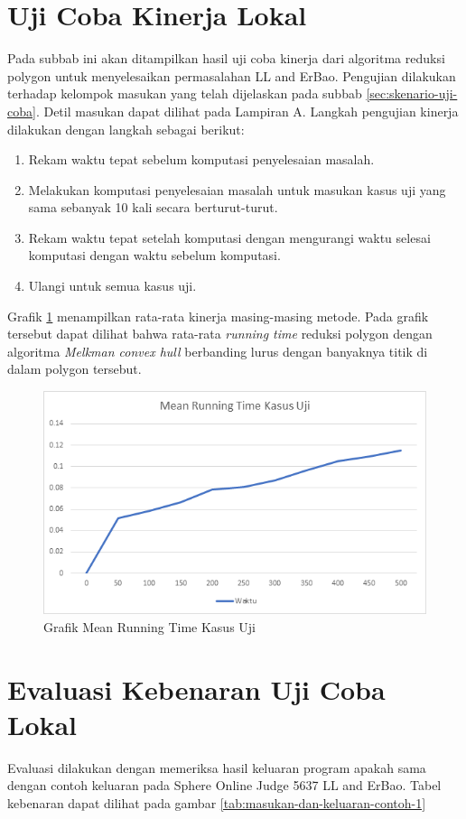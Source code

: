 \section{ Uji Coba Kinerja Lokal}
Pada subbab ini akan ditampilkan hasil uji coba kinerja dari algoritma reduksi polygon untuk menyelesaikan permasalahan LL and ErBao. Pengujian dilakukan terhadap kelompok masukan yang telah dijelaskan pada subbab \ref{sec:skenario-uji-coba}. Detil masukan dapat dilihat pada Lampiran A. Langkah pengujian kinerja dilakukan dengan langkah sebagai berikut:
\begin{enumerate}
	\item Rekam waktu tepat sebelum komputasi penyelesaian masalah.
	\item Melakukan komputasi penyelesaian masalah untuk masukan kasus uji yang sama sebanyak 10 kali secara berturut-turut.
	\item Rekam waktu tepat setelah komputasi dengan mengurangi waktu selesai komputasi dengan waktu sebelum komputasi.
	\item Ulangi untuk semua kasus uji.
\end{enumerate}
\par Grafik \ref{fig:mean-running-time} menampilkan rata-rata kinerja masing-masing metode. Pada grafik tersebut dapat dilihat bahwa rata-rata \textit{running time} reduksi polygon dengan algoritma \textit{Melkman convex hull} berbanding lurus dengan banyaknya titik di dalam polygon tersebut.
\begin{figure}[!h]
	\Centering
	\includegraphics [width=\columnwidth]{bab5/img/mean-running-time}
	\caption {Grafik Mean Running Time Kasus Uji}
	\label {fig:mean-running-time}
\end{figure}

\section{ Evaluasi Kebenaran Uji Coba Lokal}
Evaluasi dilakukan dengan memeriksa hasil keluaran program apakah sama dengan contoh keluaran pada Sphere Online Judge 5637 LL and ErBao. Tabel kebenaran dapat dilihat pada gambar \ref{tab:masukan-dan-keluaran-contoh-1}


